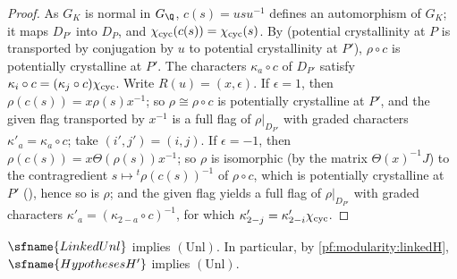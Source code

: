 \begin{proof}
As $G_K$ is normal in $G_\Q$, $c(s)=usu^{-1}$ defines an automorphism of $G_K$; it maps $D_{P'}$ into $D_P$, and
$\chi_{\mathrm{cyc}}(c(s))=\chi_{\mathrm{cyc}}(s)$. By  (potential
crystallinity at $P$ is transported by conjugation by $u$ to potential crystallinity at $P'$), $\rho\circ c$ is
potentially crystalline at $P'$. The characters $\kappa_a\circ c$ of $D_{P'}$ satisfy
$\kappa_i\circ c=(\kappa_j\circ c)\chi_{\mathrm{cyc}}$. Write $R(u)=(x,\epsilon)$. If $\epsilon=1$, then
$\rho(c(s))=x\rho(s)x^{-1}$; so $\rho\cong\rho\circ c$ is potentially crystalline at $P'$, and the given flag transported by
$x^{-1}$ is a full flag of $\rho|_{D_{P'}}$ with graded characters $\kappa'_a=\kappa_a\circ c$; take $(i',j')=(i,j)$. If
$\epsilon=-1$, then $\rho(c(s))=x\Theta(\rho(s))x^{-1}$; so $\rho$ is isomorphic (by the matrix $\Theta(x)^{-1}J$) to the
contragredient $s\mapsto{}^t\rho(c(s))^{-1}$ of $\rho\circ c$, which is potentially crystalline at $P'$
(), hence so is $\rho$; and the given flag yields a full flag
of $\rho|_{D_{P'}}$ with graded characters $\kappa'_a=(\kappa_{2-a}\circ c)^{-1}$, for which
$\kappa'_{2-j}=\kappa'_{2-i}\chi_{\mathrm{cyc}}$.
\end{proof}

\begin{theorem}\label{pf:modularity:unlend}
$\sfname{LinkedUnl}$ implies $(\mathrm{Unl})$. In particular, by \cref{pf:modularity:linkedH}, $\sfname{HypothesesH'}$
implies $(\mathrm{Unl})$.
\end{theorem}


